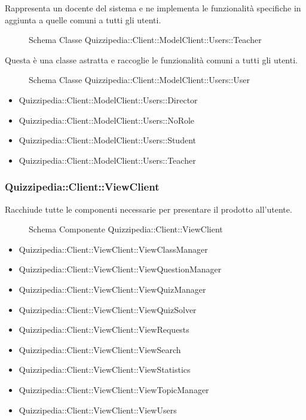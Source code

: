 Rappresenta un docente del sistema e ne implementa le funzionalità specifiche in aggiunta a quelle comuni a tutti gli utenti.
\begin{figure}[H]
\centering
\noindent{}
\caption{Schema Classe Quizzipedia::Client::ModelClient::Users::Teacher}
\end{figure}
Questa è una classe astratta e raccoglie le funzionalità comuni a tutti gli utenti.
\begin{figure}[H]
\centering
\noindent{}
\caption{Schema Classe Quizzipedia::Client::ModelClient::Users::User}
\end{figure}
\begin{itemize}
\item Quizzipedia::Client::ModelClient::Users::Director
\item Quizzipedia::Client::ModelClient::Users::NoRole
\item Quizzipedia::Client::ModelClient::Users::Student
\item Quizzipedia::Client::ModelClient::Users::Teacher
\end{itemize}
\subsubsection{Quizzipedia::Client::ViewClient}
Racchiude tutte le componenti necessarie per presentare il prodotto all'utente.
\begin{figure}[H]
\centering
\noindent{}
\caption{Schema Componente Quizzipedia::Client::ViewClient}
\end{figure}
\begin{itemize}
\item Quizzipedia::Client::ViewClient::ViewClassManager
\item Quizzipedia::Client::ViewClient::ViewQuestionManager
\item Quizzipedia::Client::ViewClient::ViewQuizManager
\item Quizzipedia::Client::ViewClient::ViewQuizSolver
\item Quizzipedia::Client::ViewClient::ViewRequests
\item Quizzipedia::Client::ViewClient::ViewSearch
\item Quizzipedia::Client::ViewClient::ViewStatistics
\item Quizzipedia::Client::ViewClient::ViewTopicManager
\item Quizzipedia::Client::ViewClient::ViewUsers
\end{itemize}
